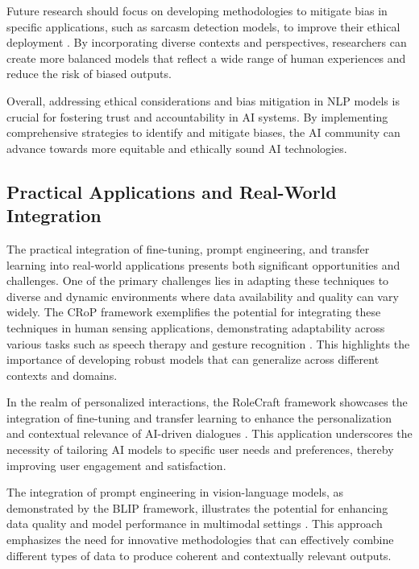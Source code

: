 Future research should focus on developing methodologies to mitigate bias in specific applications, such as sarcasm detection models, to improve their ethical deployment \cite{nimase2024morecontextshelpsarcasm}. By incorporating diverse contexts and perspectives, researchers can create more balanced models that reflect a wide range of human experiences and reduce the risk of biased outputs.



Overall, addressing ethical considerations and bias mitigation in NLP models is crucial for fostering trust and accountability in AI systems. By implementing comprehensive strategies to identify and mitigate biases, the AI community can advance towards more equitable and ethically sound AI technologies.



\subsection{Practical Applications and Real-World Integration} \label{subsec:Practical Applications and Real-World Integration}

The practical integration of fine-tuning, prompt engineering, and transfer learning into real-world applications presents both significant opportunities and challenges. One of the primary challenges lies in adapting these techniques to diverse and dynamic environments where data availability and quality can vary widely. The CRoP framework exemplifies the potential for integrating these techniques in human sensing applications, demonstrating adaptability across various tasks such as speech therapy and gesture recognition \cite{kaur2024cropcontextwiserobuststatic}. This highlights the importance of developing robust models that can generalize across different contexts and domains.



In the realm of personalized interactions, the RoleCraft framework showcases the integration of fine-tuning and transfer learning to enhance the personalization and contextual relevance of AI-driven dialogues \cite{tao2024rolecraftglmadvancingpersonalizedroleplaying}. This application underscores the necessity of tailoring AI models to specific user needs and preferences, thereby improving user engagement and satisfaction.



The integration of prompt engineering in vision-language models, as demonstrated by the BLIP framework, illustrates the potential for enhancing data quality and model performance in multimodal settings \cite{BLIP:Boots3}. This approach emphasizes the need for innovative methodologies that can effectively combine different types of data to produce coherent and contextually relevant outputs.



